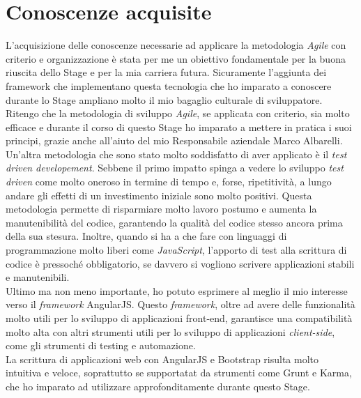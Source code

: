 \section{Conoscenze acquisite}
L'acquisizione delle conoscenze necessarie ad applicare la metodologia \emph{Agile} con criterio e organizzazione è stata per me un obiettivo fondamentale per la buona riuscita dello Stage e per la mia carriera futura. Sicuramente l'aggiunta dei framework che implementano questa tecnologia che ho imparato a conoscere durante lo Stage ampliano molto il mio bagaglio culturale di sviluppatore.\\
Ritengo che la metodologia di sviluppo \emph{Agile}, se applicata con criterio, sia molto efficace e durante il corso di questo Stage ho imparato a mettere in pratica i suoi principi, grazie anche all'aiuto del mio Responsabile aziendale Marco Albarelli.\\
Un'altra metodologia che sono stato molto soddisfatto di aver applicato è il \emph{test driven developement}. Sebbene il primo impatto spinga a vedere lo sviluppo \emph{test driven} come molto oneroso in termine di tempo e, forse, ripetitività, a lungo andare gli effetti di un investimento iniziale sono molto positivi. Questa metodologia permette di risparmiare molto lavoro postumo e aumenta la manutenibilità del codice, garantendo la qualità del codice stesso ancora prima della sua stesura. Inoltre, quando si ha a che fare con linguaggi di programmazione molto liberi come \emph{JavaScript}, l'apporto di test alla scrittura di codice è pressoché obbligatorio, se davvero si vogliono scrivere applicazioni stabili e manutenibili.\\
Ultimo ma non meno importante, ho potuto esprimere al meglio il mio interesse verso il \emph{framework} AngularJS. Questo \emph{framework}, oltre ad avere delle funzionalità molto utili per lo sviluppo di applicazioni \gls{front-end}, garantisce una compatibilità molto alta con altri strumenti utili per lo sviluppo di applicazioni \emph{client-side}, come gli strumenti di testing e automazione.\\
La scrittura di applicazioni web con AngularJS e Bootstrap risulta molto intuitiva e veloce, soprattutto se supportatat da strumenti come Grunt e Karma, che ho imparato ad utilizzare approfonditamente durante questo Stage. 

